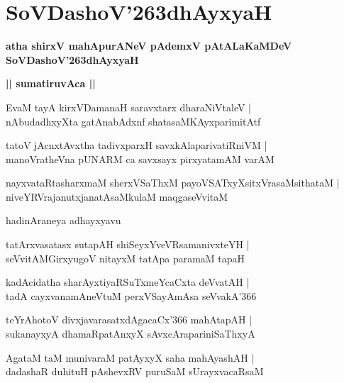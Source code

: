 \documentclass[twoside,12pt,openright]{book}
\def\S{\char'263}
\newcounter{shloka}[chapter]
\def\uvaca#1{\centerline{{\large\textbf{#1}}}}
\begin{document}
\chapter{SoVDashoV\S dhAyxyaH}

\begin{center}
{\LARGE\bfseries atha shirxV mahApurANeV pAdemxV pAtALaKaMDeV SoVDashoV\S dhAyxyaH}
\end{center}

\uvaca{|| sumatiruvAca ||}

\begin{shloka}%
EvaM tayA kirxVDamanaH saravxtarx dharaNiVtaleV |\\
nAbudadhxyXta gatAnabAdxnf shatasaMKAyxparimitAtf
\end{shloka}

\begin{shloka}%
tatoV jAcnxtAvxtha tadivxparxH savxkAlaparivatiRniVM |\\
manoVratheVna pUNARM ca savxsayx pirxyatamAM varAM 
\end{shloka}

\begin{shloka}%
nayxvataRtasharxmaM sherxVSaThxM payoVSATxyXsitxVrasaMsithataM |\\
niveYRVrajanutxjanatAsaMkulaM maqgaseVvitaM 
\end{shloka}

\begin{center}
hadinAraneya adhayxyavu
\end{center}

\begin{shloka}%
tatArxvasatasx sutapAH shiSeyxYveVRsamanivxteYH |\\
seVvitAMGirxyugoV nitayxM tatApa paramaM tapaH
\end{shloka}

\begin{shloka}%
kadAcidatha sharAyxtiyaRSuTxmeYcaCxta deVvatAH |\\
tadA cayxvanamAneVtuM perxVSayAmAsa seVvakA\char'366
\end{shloka}

\begin{shloka}%
teYrAhotoV divxjavarasatxdAgacaCx\char'366  mahAtapAH |\\
sukanayxyA dhamaRpatAnxyX sAvxcArapariniSaThxyA 
\end{shloka}

\begin{shloka}%
AgataM taM munivaraM patAyxyX saha mahAyashAH |\\
dadashaR duhituH pAshevxRV puruSaM sUrayxvacaRsaM 
\end{shloka}
\end{document}
